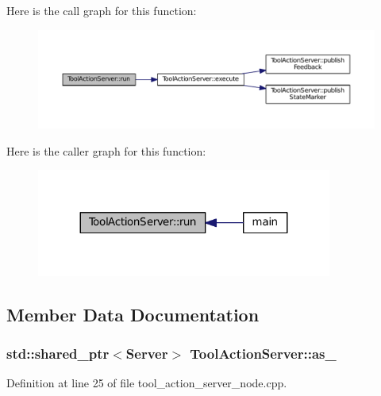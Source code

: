 Here is the call graph for this function\+:
\nopagebreak
\begin{figure}[H]
\begin{center}
\leavevmode
\includegraphics[width=350pt]{classToolActionServer_adbf39061e0f8c74352cbdc695d7d8469_cgraph}
\end{center}
\end{figure}




Here is the caller graph for this function\+:
\nopagebreak
\begin{figure}[H]
\begin{center}
\leavevmode
\includegraphics[width=275pt]{classToolActionServer_adbf39061e0f8c74352cbdc695d7d8469_icgraph}
\end{center}
\end{figure}




\subsection{Member Data Documentation}
\subsubsection[{\texorpdfstring{as\+\_\+}{as_}}]{\setlength{\rightskip}{0pt plus 5cm}std\+::shared\+\_\+ptr$<${\bf Server}$>$ Tool\+Action\+Server\+::as\+\_\+}\hypertarget{classToolActionServer_a2b90828292eb25a69449de1e67a173d6}{}\label{classToolActionServer_a2b90828292eb25a69449de1e67a173d6}


Definition at line 25 of file tool\+\_\+action\+\_\+server\+\_\+node.\+cpp.

